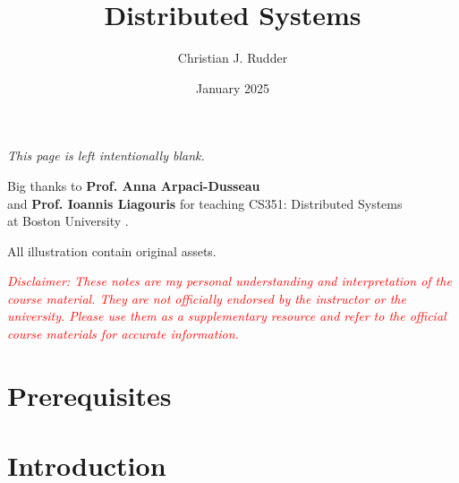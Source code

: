 \documentclass{memoir}
\title{Distributed Systems}
\author{Christian J. Rudder}
\date{January 2025}
\begin{document}
\maketitle
\setcounter{secnumdepth}{2}
\setcounter{tocdepth}{3}

\tableofcontents

\newpage
\thispagestyle{empty}
\mbox{}
\vfill
\begin{center}
    \textit{This page is left intentionally blank.}
\end{center}
\vfill
\newpage
\thispagestyle{empty}
\mbox{}
\vfill
\begin{center}
    \Large{Big thanks to \textbf{Prof. Anna Arpaci-Dusseau}}\\
    and  \textbf{Prof. Ioannis Liagouris}
    \normalsize 
    for teaching CS351: Distributed Systems\\
    at Boston University \cite{liagouris_cs351}.\\
\end{center}

\vfill

\begin{center}
    \noindent All illustration contain original assets.
\end{center}
    \begin{center}
        \textcolor{red}{\textit{Disclaimer: These notes are my personal understanding and interpretation of the course material. 
        They are not officially endorsed by the instructor or the university. Please use them as a supplementary resource and refer 
        to the official course materials for accurate information.}}
    \end{center}

    \chapter*{Prerequisites}
    
    
\chapter{Introduction}
% 
% 
% 
% 
% 
% 
% 

% 
% 
% 
% 
% 
% 
% 


\end{document}
